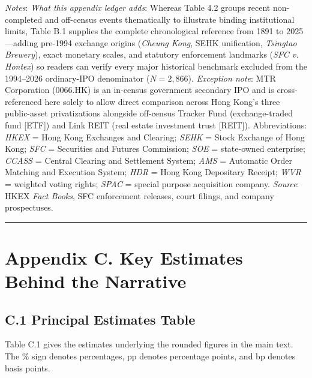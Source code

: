 \documentclass[11pt,letterpaper]{article}
\begin{document}
\begin{table}[!htbp]
\par\vspace{3pt}\noindent\parbox{\textwidth}{\scriptsize\raggedright \textit{Notes}: \textit{What this appendix ledger adds}: Whereas Table 4.2 groups recent non-completed and off-census events thematically to illustrate binding institutional limits, Table B.1 supplies the complete chronological reference from 1891 to 2025—adding pre-1994 exchange origins (\textit{Cheung Kong}, SEHK unification, \textit{Tsingtao Brewery}), exact monetary scales, and statutory enforcement landmarks (\textit{SFC v. Hontex}) so readers can verify every major historical benchmark excluded from the 1994–2026 ordinary-IPO denominator ($N = 2,866$). \textit{Exception note}: MTR Corporation (0066.HK) is an in-census government secondary IPO and is cross-referenced here solely to allow direct comparison across Hong Kong's three public-asset privatizations alongside off-census Tracker Fund (exchange-traded fund [ETF]) and Link REIT (real estate investment trust [REIT]). Abbreviations: \textit{HKEX} = Hong Kong Exchanges and Clearing; \textit{SEHK} = Stock Exchange of Hong Kong; \textit{SFC} = Securities and Futures Commission; \textit{SOE} = state-owned enterprise; \textit{CCASS} = Central Clearing and Settlement System; \textit{AMS} = Automatic Order Matching and Execution System; \textit{HDR} = Hong Kong Depositary Receipt; \textit{WVR} = weighted voting rights; \textit{SPAC} = special purpose acquisition company. \textit{Source}: HKEX \textit{Fact Books}, SFC enforcement releases, court filings, and company prospectuses.}
\end{table}

\par\medskip\noindent\rule{\linewidth}{0.35pt}\par\medskip
\section*{\texorpdfstring{Appendix C. Key Estimates Behind the Narrative}{Appendix C. Key Estimates Behind the Narrative}}
\subsection*{\texorpdfstring{C.1 Principal Estimates Table}{C.1 Principal Estimates Table}}
Table C.1 gives the estimates underlying the rounded figures in the main text. The \% sign denotes percentages, pp denotes percentage points, and bp denotes basis points.
\end{document}
